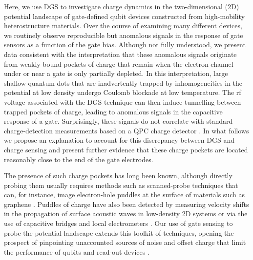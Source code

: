 Here, we use DGS to investigate charge dynamics in the two-dimensional (2D) potential landscape of gate-defined qubit devices constructed from high-mobility heterostructure materials. Over the course of examining many different devices, we routinely observe reproducible but anomalous signals in the response of gate sensors as a function of the gate bias. Although not fully understood, we present data consistent with the interpretation that these anomalous signals originate from weakly bound pockets of charge that remain when the electron channel under or near a gate is only partially depleted. In this interpretation, large shallow quantum dots that are inadvertently trapped by inhomogeneities in the potential at low density \cite{PhysRevB.41.7929} undergo Coulomb blockade at low temperature. The rf voltage associated with the DGS technique can then induce tunnelling between trapped pockets of charge, leading to anomalous signals in the capacitive response of a gate. Surprisingly, these signals do not correlate with standard charge-detection measurements based on a QPC charge detector \cite{PhysRevLett.70.1311}. In what follows we propose an explanation to account for this discrepancy between DGS and charge sensing and present further evidence that these charge pockets are located reasonably close to the end of the gate electrodes.

The presence of such charge pockets has long been known, although directly probing them usually requires methods such as scanned-probe techniques \cite{Finkelstein90} that can, for instance, image electron-hole puddles \cite{PhysRevB.84.115442} at the surface of materials such as graphene \cite{Yacoby_scanned}. Puddles of charge have also been detected by measuring velocity shifts in the propagation of surface acoustic waves in low-density 2D systems \cite{TRACY2006150} or via the use of capacitive bridges \cite{Ashoori_science} and local electrometers \cite{Ilani1354}. Our use of gate sensing to probe the potential landscape extends this toolkit of techniques, opening the prospect of pinpointing unaccounted sources of noise and offset charge that limit the performance of qubits and read-out devices \cite{PhysRevLett.110.146804,Shulman202,Zoo_2Q}.

